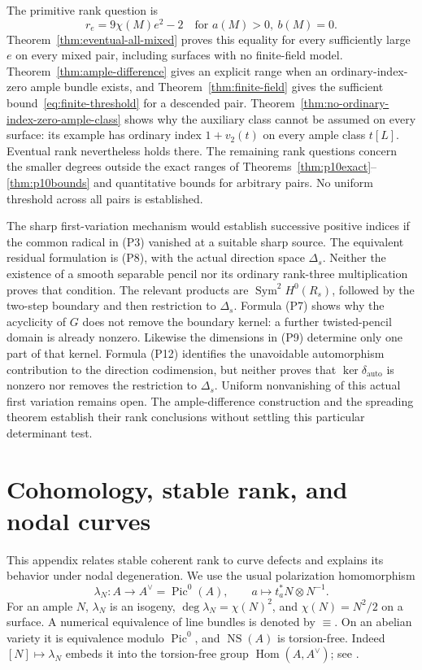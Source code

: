 \documentclass[11pt]{article}
\theoremstyle{definition}\newtheorem{definition}[theorem]{Definition}
\theoremstyle{remark}\newtheorem{remark}[theorem]{Remark}
\newcommand{\Pic}{\operatorname{Pic}}
\newcommand{\NS}{\operatorname{NS}}
\newcommand{\Hom}{\operatorname{Hom}}
\begin{document}
The primitive rank question is
\[
       r_e=9\chi(M)e^2-2\quad\text{for }a(M)>0,\ b(M)=0.
\]
Theorem~\ref{thm:eventual-all-mixed} proves this equality for every sufficiently large $e$ on every mixed pair, including surfaces with no finite-field model. Theorem~\ref{thm:ample-difference} gives an explicit range when an ordinary-index-zero ample bundle exists, and Theorem~\ref{thm:finite-field} gives the sufficient bound~\eqref{eq:finite-threshold} for a descended pair. Theorem~\ref{thm:no-ordinary-index-zero-ample-class} shows why the auxiliary class cannot be assumed on every surface: its example has ordinary index $1+v_2(t)$ on every ample class $t[L]$. Eventual rank nevertheless holds there. The remaining rank questions concern the smaller degrees outside the exact ranges of Theorems~\ref{thm:p10exact}--\ref{thm:p10bounds} and quantitative bounds for arbitrary pairs. No uniform threshold across all pairs is established.

The sharp first-variation mechanism would establish successive positive indices if the common radical in (P3) vanished at a suitable sharp source. The equivalent residual formulation is (P8), with the actual direction space $\Delta_s$. Neither the existence of a smooth separable pencil nor its ordinary rank-three multiplication proves that condition. The relevant products are $\operatorname{Sym}^2H^0(R_s)$, followed by the two-step boundary and then restriction to $\Delta_s$. Formula (P7) shows why the acyclicity of $G$ does not remove the boundary kernel: a further twisted-pencil domain is already nonzero. Likewise the dimensions in (P9) determine only one part of that kernel. Formula (P12) identifies the unavoidable automorphism contribution to the direction codimension, but neither proves that $\ker\delta_{\mathrm{auto}}$ is nonzero nor removes the restriction to $\Delta_s$. Uniform nonvanishing of this actual first variation remains open. The ample-difference construction and the spreading theorem establish their rank conclusions without settling this particular determinant test.

\appendix
\section{Cohomology, stable rank, and nodal curves}\label{app:cohomology}

This appendix relates stable coherent rank to curve defects and explains its behavior under nodal degeneration. We use the usual polarization homomorphism
\[
 \lambda_N:A\longrightarrow A^\vee=\Pic^0(A),\qquad
 a\longmapsto t_a^*N\otimes N^{-1}.
\]
For an ample $N$, $\lambda_N$ is an isogeny, $\deg\lambda_N=\chi(N)^2$, and $\chi(N)=N^2/2$ on a surface. A numerical equivalence of line bundles is denoted by $\equiv$. On an abelian variety it is equivalence modulo $\Pic^0$, and $\NS(A)$ is torsion-free. Indeed $[N]\mapsto\lambda_N$ embeds it into the torsion-free group $\Hom(A,A^\vee)$; see \citet[\S7 and Proposition~11.2--Corollary~11.3, pp.~159--160]{EGM}.
\end{document}
